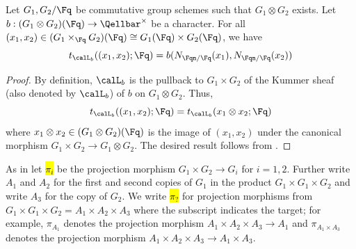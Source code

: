 \begin{corollary}
    Let $G_1,G_2/\Fq$ be commutative group schemes such that $G_1 \otimes G_2$ exists. Let $b: (G_1 \otimes G_2)(\Fq) \to \Qellbar^\times$ be a character. For all $(x_1,x_2) \in (G_1 \times_{\Fq} G_2)(\Fq) \cong G_1(\Fq) \times G_2(\Fq)$, we have  
    $$t_{\calL_b}((x_1,x_2);\Fq) = b(N_{\Fqn / \Fq}(x_1), N_{\Fqn / \Fq}(x_2))$$
\end{corollary}
\begin{proof}
    By definition, $\calL_b$ is the pullback to $G_1 \times G_2$ of the Kummer sheaf (also denoted by $\calL_b$) of $b$ on $G_1 \otimes G_2$. Thus, 
    $$t_{\calL_b}((x_1,x_2);\Fq) = t_{\calL_b}(x_1 \otimes x_2;\Fq)$$
    where $x_1 \otimes x_2 \in (G_1 \otimes G_2)(\Fq)$ is the image of $(x_1,x_2)$ under the canonical morphism $G_1 \times G_2 \to G_1 \otimes G_2$. The desired result follows from .
\end{proof}

\begin{notation} \label{notation:projection_morphisms_for_fourier_transform_functor_proof}
As in  let \hl{$\pi_i$} be the projection morphism $G_1 \times G_2 \to G_i$ for $i = 1,2$. Further write $A_1$ and $A_2$ for the first and second copies of $G_1$ in the product $G_1 \times G_1 \times G_2$ and write $A_3$ for the copy of $G_2$. We write \hl{$\pi_{?}$} for projection morphisms from $G_1 \times G_1 \times G_2 = A_1 \times A_2 \times A_3$ where the subscript indicates the target; for example, $\pi_{A_1}$ denotes the projection morphism $A_1 \times A_2 \times A_3 \to A_1$ and $\pi_{A_1 \times A_3}$ denotes the projection morphism $A_1 \times A_2 \times A_3 \to A_1 \times A_3$.
\end{notation}

